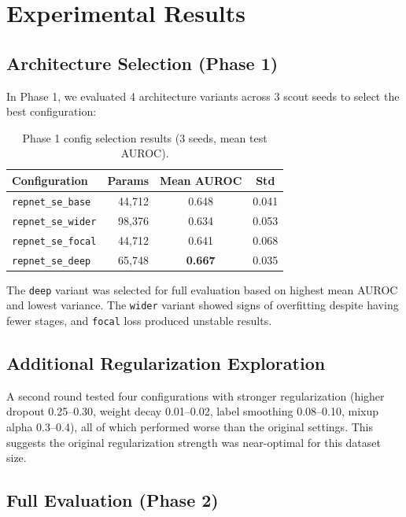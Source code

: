 \documentclass[11pt,a4paper]{article}
\begin{document}
\section{Experimental Results}
\label{sec:results}

\subsection{Architecture Selection (Phase 1)}

In Phase 1, we evaluated 4 architecture variants across 3 scout seeds to select the best configuration:

\begin{table}[H]
\centering
\caption{Phase 1 config selection results (3 seeds, mean test AUROC).}
\label{tab:phase1}
\begin{tabular}{lrcc}
\toprule
\textbf{Configuration} & \textbf{Params} & \textbf{Mean AUROC} & \textbf{Std} \\
\midrule
\texttt{repnet\_se\_base} & 44,712 & 0.648 & 0.041 \\
\texttt{repnet\_se\_wider} & 98,376 & 0.634 & 0.053 \\
\texttt{repnet\_se\_focal} & 44,712 & 0.641 & 0.068 \\
\texttt{repnet\_se\_deep} & 65,748 & \textbf{0.667} & 0.035 \\
\bottomrule
\end{tabular}
\end{table}

The \texttt{deep} variant was selected for full evaluation based on highest mean AUROC and lowest variance. The \texttt{wider} variant showed signs of overfitting despite having fewer stages, and \texttt{focal} loss produced unstable results.

\subsection{Additional Regularization Exploration}

A second round tested four configurations with stronger regularization (higher dropout 0.25--0.30, weight decay 0.01--0.02, label smoothing 0.08--0.10, mixup alpha 0.3--0.4), all of which performed worse than the original settings. This suggests the original regularization strength was near-optimal for this dataset size.

\subsection{Full Evaluation (Phase 2)}
\end{document}
